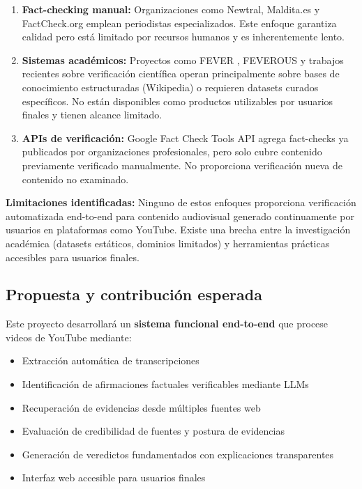 \documentclass[12pt,a4paper]{article}
\begin{document}
\begin{enumerate}
    \item \textbf{Fact-checking manual:} Organizaciones como Newtral, Maldita.es y FactCheck.org emplean periodistas especializados. Este enfoque garantiza calidad pero está limitado por recursos humanos y es inherentemente lento.

    \item \textbf{Sistemas académicos:} Proyectos como FEVER \citep{thorne2018fever}, FEVEROUS \citep{aly2021feverous} y trabajos recientes sobre verificación científica \citep{wadden2020scifact} operan principalmente sobre bases de conocimiento estructuradas (Wikipedia) o requieren datasets curados específicos. No están disponibles como productos utilizables por usuarios finales y tienen alcance limitado.

    \item \textbf{APIs de verificación:} Google Fact Check Tools API agrega fact-checks ya publicados por organizaciones profesionales, pero solo cubre contenido previamente verificado manualmente. No proporciona verificación nueva de contenido no examinado.
\end{enumerate}

\textbf{Limitaciones identificadas:} Ninguno de estos enfoques proporciona verificación automatizada end-to-end para contenido audiovisual generado continuamente por usuarios en plataformas como YouTube. Existe una brecha entre la investigación académica (datasets estáticos, dominios limitados) y herramientas prácticas accesibles para usuarios finales.

\subsection{Propuesta y contribución esperada}

Este proyecto desarrollará un \textbf{sistema funcional end-to-end} que procese videos de YouTube mediante:

\begin{itemize}
    \item Extracción automática de transcripciones
    \item Identificación de afirmaciones factuales verificables mediante LLMs
    \item Recuperación de evidencias desde múltiples fuentes web
    \item Evaluación de credibilidad de fuentes y postura de evidencias
    \item Generación de veredictos fundamentados con explicaciones transparentes
    \item Interfaz web accesible para usuarios finales
\end{itemize}
\end{document}
